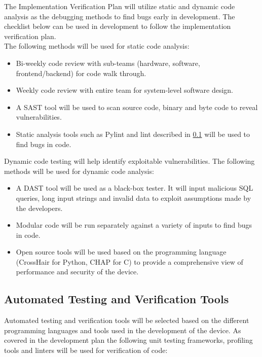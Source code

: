 \documentclass[12pt, titlepage]{article}
\begin{document}
The Implementation Verification Plan will utilize static and dynamic code analysis as the debugging methods to find bugs early in development. The checklist below can be used in development to follow the implementation verification plan.\\
The following methods will be used for static code analysis:
\begin{itemize}
  \item Bi-weekly code review with sub-teams (hardware, software, frontend/backend) for code walk through.
  \item Weekly code review with entire team for system-level software design.
  \item A SAST tool will be used to scan source code, binary and byte code to reveal vulnerabilities.
  \item Static analysis tools such as Pylint and lint described in \ref{Automation} will be used to find bugs in code.
\end{itemize}
Dynamic code testing will help identify exploitable vulnerabilities. The following methods will be used for dynamic code analysis:
\begin{itemize}
  \item A DAST tool will be used as a black-box tester. It will input malicious SQL queries, long input strings and invalid data to exploit assumptions made by the developers.
  \item Modular code will  be run separately against a variety of inputs to find bugs in code.
  \item Open source tools will be used based on the programming language (CrossHair for Python, CHAP for C) to provide a comprehensive view of performance and security of the device.
\end{itemize}


\subsection{Automated Testing and Verification Tools}\label{Automation}

Automated testing and verification tools will be selected based on the different programming languages and tools used in the development of the device. As covered in the development plan \cite{Development_Plan} the following unit testing frameworks, profiling tools and linters will be used for verification of code:
\end{document}
